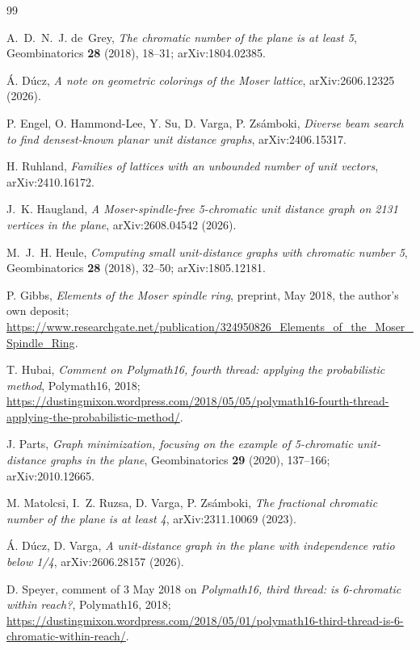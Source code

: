 \documentclass[11pt,reqno]{amsart}
\theoremstyle{plain}
\theoremstyle{definition}
\begin{document}
\enlargethispage{3\baselineskip}
\begin{thebibliography}{99}
\setlength{\itemsep}{0pt}\setlength{\parsep}{0pt}

A.~D.~N.~J. de~Grey,
\emph{The chromatic number of the plane is at least 5},
Geombinatorics \textbf{28} (2018), 18--31; arXiv:1804.02385.

\'A. D\'ucz,
\emph{A note on geometric colorings of the Moser lattice},
arXiv:2606.12325 (2026).

P. Engel, O. Hammond-Lee, Y. Su, D. Varga, P. Zs\'amboki,
\emph{Diverse beam search to find densest-known planar unit distance graphs},
arXiv:2406.15317.

H. Ruhland,
\emph{Families of lattices with an unbounded number of unit vectors},
arXiv:2410.16172.

J.~K. Haugland,
\emph{A Moser-spindle-free 5-chromatic unit distance graph on 2131 vertices in
the plane},
arXiv:2608.04542 (2026).

M.~J.~H. Heule,
\emph{Computing small unit-distance graphs with chromatic number 5},
Geombinatorics \textbf{28} (2018), 32--50; arXiv:1805.12181.

P. Gibbs, \emph{Elements of the Moser spindle ring}, preprint, May 2018,
the author's own deposit;
\url{https://www.researchgate.net/publication/324950826_Elements_of_the_Moser_Spindle_Ring}.

T. Hubai,
\emph{Comment on Polymath16, fourth thread: applying the probabilistic method},
Polymath16, 2018;
\url{https://dustingmixon.wordpress.com/2018/05/05/polymath16-fourth-thread-applying-the-probabilistic-method/}.

J. Parts,
\emph{Graph minimization, focusing on the example of 5-chromatic unit-distance
graphs in the plane},
Geombinatorics \textbf{29} (2020), 137--166; arXiv:2010.12665.

M. Matolcsi, I.~Z. Ruzsa, D. Varga, P. Zs\'amboki,
\emph{The fractional chromatic number of the plane is at least 4},
arXiv:2311.10069 (2023).

\'A. D\'ucz, D. Varga,
\emph{A unit-distance graph in the plane with independence ratio below 1/4},
arXiv:2606.28157 (2026).

D. Speyer, comment of 3 May 2018 on \emph{Polymath16, third thread: is
6-chromatic within reach?}, Polymath16, 2018;
\url{https://dustingmixon.wordpress.com/2018/05/01/polymath16-third-thread-is-6-chromatic-within-reach/}.


\end{thebibliography}
\end{document}
